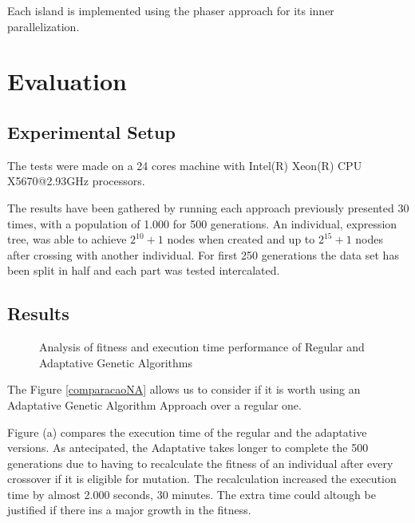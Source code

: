 \documentclass[runningheads]{llncs}
\begin{document}
Each island is implemented using the phaser approach for its inner parallelization.

\section{Evaluation}

\subsection{Experimental Setup}
The tests were made on a 24 cores machine with Intel(R) Xeon(R) CPU X5670@2.93GHz processors.

The results have been gathered by running each approach previously presented 30 times, with a population of 1.000 for 500 generations. An individual, expression tree, was able to achieve \(2^{10} + 1\) nodes when created and up to \(2^{15} + 1\) nodes after crossing with another individual. For first 250 generations the data set has been split in half and each part was tested intercalated.

\subsection{Results}
\begin{figure}[H]
\centering
{}%
\qquad
{}%
\caption{Analysis of fitness and execution time performance of Regular and Adaptative Genetic Algorithms} \label{comparacaoNA}
\label{comparacaoImpl}%
\end{figure}
The Figure \ref{comparacaoNA} allows us to consider if it is worth using an Adaptative Genetic Algorithm Approach over a regular one.

Figure (a) compares the execution time of the regular and the adaptative versions. As antecipated, the Adaptative takes longer to complete the 500 generations due to having to recalculate the fitness of an individual after every crossover if it is eligible for mutation. The recalculation increased the execution time by almost 2.000 seconds, 30 minutes. The extra time could altough be justified if there ins a major growth in the fitness.
\end{document}
